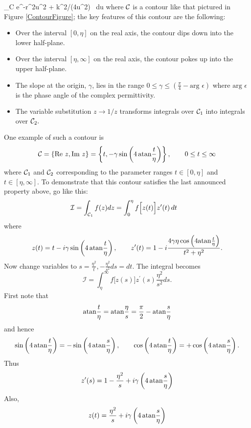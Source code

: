 \documentclass[letterpaper]{article}
\begin{document}
{
\equiv 
  \int_{\mc C}
  e^{-r^2u^2 + k^2/(4u^2)} \, du
}
where $\mathcal{C}$ is a contour like that pictured
in Figure \ref{ContourFigure}; the key features 
of this contour are the following:
\begin{itemize}
 \item
 Over the interval $[0,\eta]$ on the real axis,
 the contour dips down into the lower half-plane.
 \item
 Over the interval $[\eta,\infty]$ on the real axis,
 the contour pokes up into the upper half-plane.
 \item
 The slope at the origin, $\gamma$, lies in the range
 $ 0 \le \gamma \le \left(\frac{\pi}{4} - \text{arg }\epsilon\right)$
 where $\text{arg }\epsilon$ is the phase angle of
 the complex permittivity.
 \item
 The variable substitution $z\to 1/z$ transforms integrals over 
 $\mathcal{C}_1$ into integrals over $\mathcal{C}_2.$
\end{itemize}

One example of such a contour is 
$$ \mathcal{C} 
    = \{ \text{Re } z, \text{Im } z\}
    = \left\{ t, -\gamma \sin\left(4\, \text{atan} \frac{t}{\eta}\right)\right\},
      \qquad 0\le t \le \infty
$$
where $\mathcal{C}_1$ and $\mathcal{C}_2$ corresponding to the parameter ranges
$t\in [0,\eta]$ and $t\in[\eta,\infty]$. To demonstrate that this
contour satisfies the last announced property above, go like this:
\begin{align*}
\mathcal{I}=
\int_{\mathcal{C}_1} f(z) dz
 &=\int_{0}^\eta
       f\Big[ z(t) \Big] 
       z^\prime(t) \, dt
\end{align*}
where 
$$ z(t)=t-i\gamma\sin\left(4\,\text{atan} \frac{t}{\eta}\right), 
   \qquad
   z^\prime(t)
   =
   1 - i\frac{4\gamma\eta\cos\left(4\text{atan}\frac{t}{\eta}\right)}
                      {t^2 + \eta^2}.
$$
Now change variables to $s=\frac{\eta^2}{t}, -\frac{\eta^2}{s^2}ds=dt.$
The integral becomes
$$\mathcal{I} 
  = 
  \int_\eta^\infty f\Big[z(s)\Big] z^\prime(s) \frac{\eta^2}{s^2}ds.
$$
First note that 
$$ \text{atan}\frac{t}{\eta} = \text{atan}\frac{\eta}{s} 
   = \frac{\pi}{2}-\text{atan}\frac{s}{\eta}$$
and hence
$$
 \sin\left(4\,\text{atan}\frac{t}{\eta} \right)
= - \sin\left(4\,\text{atan}\frac{s}{\eta}\right), 
\qquad 
 \cos\left(4\,\text{atan}\frac{t}{\eta} \right)
= + \cos\left(4\,\text{atan}\frac{s}{\eta}\right).
$$
Thus 
$$ z^\prime(s) 
   = 
   1 - \frac{\eta^2}{s} + i\gamma\left(4\,\text{atan}\frac{s}{\eta}\right)
$$
Also,
$$ z(t) = \frac{\eta^2}{s} + i\gamma\left(4\,\text{atan}\frac{s}{\eta}\right)$$
\end{document}

